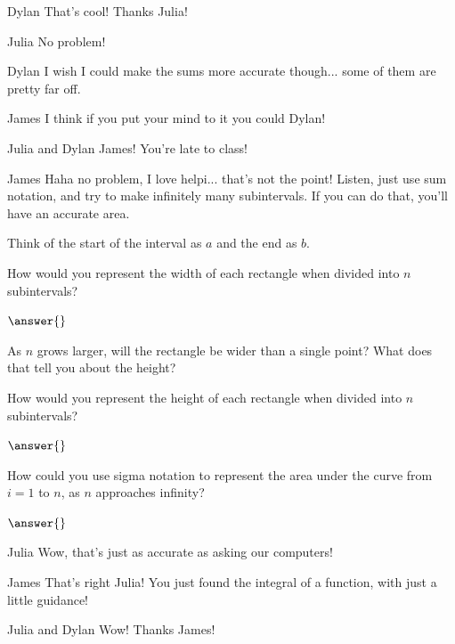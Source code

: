 \documentclass{ximera}
\begin{document}
\begin{dialogue}
\item[Dylan] That's cool! Thanks Julia!
\item[Julia] No problem!
\item[Dylan] I wish I could make the sums more accurate though... some of them are pretty far off.
\item[James] I think if you put your mind to it you could Dylan!
\item[Julia and Dylan] James! You're late to class!
\item[James] Haha no problem, I love helpi... that's not the point! Listen, just use sum notation, and try to make infinitely many subintervals. If you can do that, you'll have an accurate area.
\end{dialogue}
\begin{question}

\begin{hint}
Think of the start of the interval as $a$ and the end as $b$.
\end{hint}

How would you represent the width of each rectangle when divided into $n$ subintervals?

$\answer{}$

\begin{hint}
As $n$ grows larger, will the rectangle be wider than a single point? What does that tell you about the height?
\end{hint}

How would you represent the height of each rectangle when divided into $n$ subintervals?

$\answer{}$

How could you use sigma notation to represent the area under the curve from $i = 1$ to $n$, as $n$ approaches infinity?

$\answer{}$

\end{question}
\begin{dialogue}
\item[Julia] Wow, that's just as accurate as asking our computers!
\item[James] That's right Julia! You just found the integral of a function, with just a little guidance!
\item[Julia and Dylan] Wow! Thanks James!
\end{dialogue}
\end{document}
